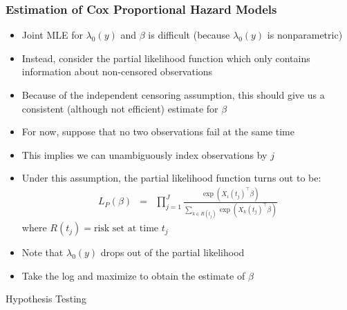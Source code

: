 \documentclass{beamer}
\begin{document}
\begin{frame}
\frametitle{Estimation of Cox Proportional Hazard Models}
\small
\vspace{-.5\baselineskip}
\begin{itemize}
  \item Joint MLE for $\lambda_0(y)$ and $\beta$ is difficult (because $\lambda_0(y)$ is nonparametric)
  \item Instead, consider the \alert{partial likelihood function} which only contains
    information about non-censored observations
\pause
  \item Because of the independent censoring assumption, this should give us
    a consistent (although not efficient) estimate for $\beta$
\pause
\smallskip
  \item For now, suppose that no two observations fail at the same time
  \item This implies we can unambiguously index observations by $j$
\pause
\medskip
  \item Under this assumption, the partial likelihood function turns out to be:
  {\footnotesize
    \begin{eqnarray*}
   L_P(\beta) & = & \prod_{j=1}^J \frac{\exp(X_i(t_j)^\top\beta)}
             {\sum_{k\in R(t_j)}\exp(X_{k}(t_j)^\top\beta)}
    \end{eqnarray*}
    where $R(t_j) = \text{risk set at time } t_j$
    }
\pause
  \item Note that $\lambda_0(y)$ drops out of the partial likelihood
\pause
\smallskip
  \item Take the log and maximize to obtain the estimate of $\beta$
\end{itemize}
\end{frame}







\begin{frame}

\huge

Hypothesis Testing

\end{frame}
\end{document}
